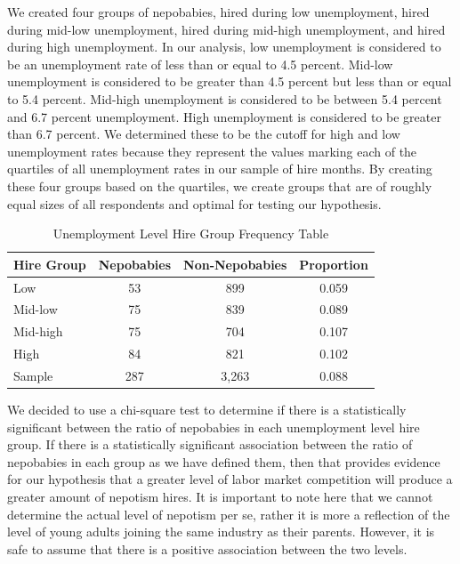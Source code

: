 \documentclass[12pt]{article}
\begin{document}
We created four groups of nepobabies, hired during low unemployment, hired during mid-low unemployment, hired during mid-high unemployment, and hired during high unemployment. In our analysis, low unemployment is considered to be an unemployment rate of less than or equal to 4.5 percent. Mid-low unemployment is considered to be greater than 4.5 percent but less than or equal to 5.4 percent. Mid-high unemployment is considered to be between 5.4 percent and 6.7 percent unemployment. High unemployment is considered to be greater than 6.7 percent. We determined these to be the cutoff for high and low unemployment rates because they represent the values marking each of the quartiles of all unemployment rates in our sample of hire months. By creating these four groups based on the quartiles, we create groups that are of roughly equal sizes of all respondents and optimal for testing our hypothesis.

\begin{table}[ht]
\centering
\begin{tabular}{l|cc|c}
Hire Group & Nepobabies & Non-Nepobabies & Proportion \\ 
\hline 
Low & 53 & 899 & 0.059 \\
Mid-low & 75 & 839 & 0.089\\
Mid-high & 75 & 704 & 0.107 \\
High & 84 & 821 & 0.102 \\
\hline 
Sample & 287 & 3,263 & 0.088 \\
\end{tabular}
\caption{Unemployment Level Hire Group Frequency Table}
\label{tab:mytable}
\end{table}



We decided to use a chi-square test to determine if there is a statistically significant between the ratio of nepobabies in each unemployment level hire group. If there is a statistically significant association between the ratio of nepobabies in each group as we have defined them, then that provides evidence for our hypothesis that a greater level of labor market competition will produce a greater amount of nepotism hires. It is important to note here that we cannot determine the actual level of nepotism per se, rather it is more a reflection of the level of young adults joining the same industry as their parents. However, it is safe to assume that there is a positive association between the two levels.
\end{document}
